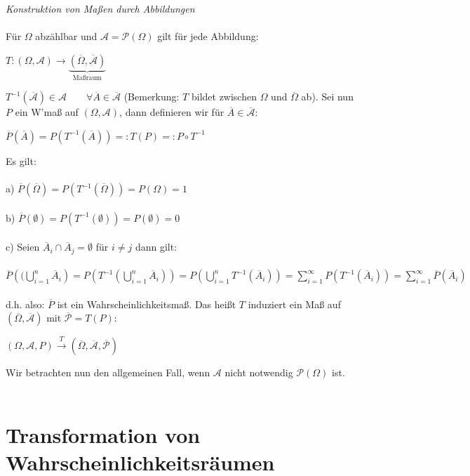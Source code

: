 \documentclass[10pt,a4paper]{report}
\numberwithin{equation}{section}
\numberwithin{figure}{section}
\theoremstyle{plain}
\theoremstyle{definition}
\theoremstyle{plain}
\theoremstyle{definition}
\theoremstyle{remark}
\theoremstyle{plain}
\theoremstyle{plain}
\theoremstyle{plain}
\theoremstyle{plain}
\theoremstyle{plain}
\newcommand{\1}{ \mathbb{1} } %
\begin{document}
\textit{Konstruktion von Maßen durch Abbildungen}\\\\
Für $\Omega$ abzählbar und $\mathcal{A}=\mathcal{P}(\Omega)$ gilt für jede Abbildung:\begin{center}
$T:(\Omega,\mathcal{A}) \to \underbrace{(\overline{\Omega},\overline{\mathcal{A}})}_\text{Maßraum}$
\end{center}
$T^{-1}(\overline{\mathcal{A}})\in \mathcal{A} \qquad \forall \overline{A} \in \overline{\mathcal{A}}$ (Bemerkung: $T$ bildet zwischen $\Omega$ und  $\overline{\Omega}$ ab). Sei nun $P$ ein W'maß auf $(\Omega,\mathcal{A})$, dann definieren wir für $\overline{A} \in \overline{\mathcal{A}}$:
\begin{center}
$\overline{P}(\overline{A})=P(T^{-1}(\overline{A}))=:T(P)=:P\circ T^{-1}$
\end{center}
Es gilt:\\\\
a) $\overline{P}(\overline{\Omega})=P(T^{-1}(\overline{\Omega}))=P(\Omega)=1$\\\\
b) $\overline{P}(\emptyset)=P(T^{-1}(\emptyset))=P(\emptyset)=0$\\\\
c) Seien $\overline{A}_i\cap \overline{A}_j=\emptyset$ für $i\neq j$ dann gilt:\\\\ $\overline{P}\left((\bigcup\limits_{i=1}^n \overline{A}_i \right)=P\left(T^{-1}\left(\bigcup\limits_{i=1}^n \overline{A}_i\right)\right)=P\left(\bigcup\limits_{i=1}^n T^{-1}(\overline{A}_i)\right)=\sum\limits_{i=1}^\infty P(T^{-1}(\overline{A}_i))=\sum\limits_{i=1}^\infty \overline{P}(\overline{A}_i)$\\\\
d.h. also: $\overline{P}$ ist ein Wahrscheinlichkeitsmaß. Das heißt $T$ induziert ein Maß auf $(\overline{\Omega},\overline{\mathcal{A}})$ mit $\overline{\mathcal{P}}=T(P)$:
\begin{center}
$(\Omega, \mathcal{A}, P) \overset{T}{\to}(\overline{\Omega},\overline{\mathcal{A}},\overline{\mathcal{P}})$
\end{center}
Wir betrachten nun den allgemeinen Fall, wenn $\mathcal{A}$ nicht notwendig $\mathcal{P}(\Omega)$ ist.\\\\

\section{Transformation von Wahrscheinlichkeitsräumen}
\label{sec:trafo-wraeume}
\end{document}
